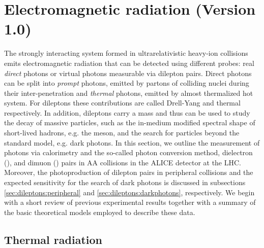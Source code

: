 \documentclass[../report.tex]{subfiles}
\begin{document}
\section{Electromagnetic radiation (Version 1.0)}

The strongly interacting system formed in ultrarelativistic heavy-ion collisions 
emits electromagnetic radiation that can be detected using different probes: real {\it direct} photons %
or virtual photons measurable via dilepton pairs. 
Direct photons can be split into {\it prompt} photons, emitted by partons of colliding nuclei during their inter-penetration and {\it thermal} photons, emitted by almost thermalized hot system. 
For dileptons these contributions are called Drell-Yang and thermal respectively.
In addition, dileptons carry a mass and thus can be used to study the decay of massive particles, such as the in-medium modified spectral shape of short-lived hadrons, e.g. the \Prho meson, and the search for particles beyond the standard model, e.g. dark photons. In this section, we outline the measurement of photons via calorimetry and the so-called photon conversion method, dielectron (\Pepem), and dimuon (\PGmpGmm) pairs in AA collisions in the ALICE detector at the LHC. Moreover, the photoproduction of dilepton pairs in peripheral collisions and the expected sensitivity for the search of dark photons is discussed in subsections \ref{sec:dileptons:peripheral} and \ref{sec:dileptons:darkphotons}, respectively. We begin with a short review of previous experimental results together with a summary of the basic theoretical models employed to describe these data.


\subsection{Thermal radiation}
\end{document}
